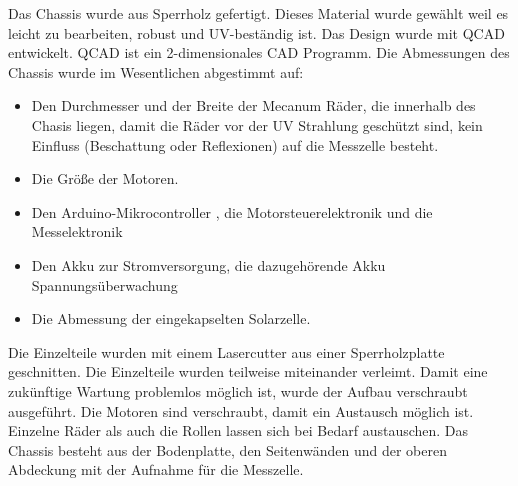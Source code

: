\documentclass[a4paper,bibtotoc,oneside]{scrbook}
\begin{document}
\noindent Das Chassis wurde aus Sperrholz gefertigt. Dieses Material wurde gewählt weil es leicht zu bearbeiten, robust und UV-beständig ist. Das Design wurde mit QCAD entwickelt. QCAD ist ein 2-dimensionales CAD Programm. 
Die Abmessungen des Chassis wurde im Wesentlichen abgestimmt auf: \begin{itemize}
\item Den Durchmesser und der Breite der Mecanum Räder, die innerhalb des Chasis liegen, damit die Räder vor der UV Strahlung geschützt sind, kein Einfluss (Beschattung oder Reflexionen) auf die Messzelle besteht.
\item Die Größe der Motoren.
\item Den Arduino-Mikrocontroller , die Motorsteuerelektronik und die Messelektronik
\item Den Akku zur Stromversorgung, die dazugehörende Akku Spannungsüberwachung 
\item Die Abmessung der eingekapselten Solarzelle.
 \end{itemize}

\noindent Die Einzelteile wurden mit einem Lasercutter aus einer Sperrholzplatte geschnitten. Die Einzelteile wurden teilweise miteinander verleimt. Damit eine zukünftige Wartung problemlos möglich ist, wurde der Aufbau verschraubt ausgeführt.
Die Motoren sind verschraubt, damit ein Austausch möglich ist. Einzelne Räder als auch die Rollen lassen sich bei Bedarf austauschen.
Das Chassis besteht aus der Bodenplatte, den Seitenwänden und der oberen Abdeckung mit der Aufnahme für die Messzelle.
\end{document}
